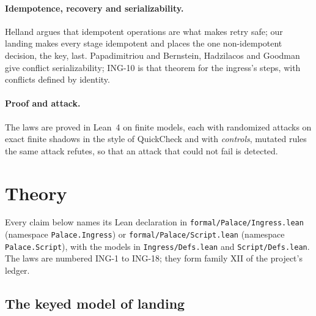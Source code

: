 \documentclass[11pt]{article}
\theoremstyle{plain}
\theoremstyle{definition}
\theoremstyle{remark}
\newcommand{\lean}[1]{\texttt{#1}}
\newcommand{\ing}[1]{ING-#1}
\begin{document}
\paragraph{Idempotence, recovery and serializability.}
Helland \citep{helland2012} argues that idempotent operations are what makes retry safe;
our landing makes every stage idempotent and places the one non-idempotent decision, the key,
last. Papadimitriou \citep{papadimitriou1979} and Bernstein, Hadzilacos and Goodman
\citep{bernstein1987} give conflict serializability; \ing{10} is that theorem for the ingress's
steps, with conflicts defined by identity.

\paragraph{Proof and attack.}
The laws are proved in Lean~4 \citep{demoura2021} on finite models, each with randomized
attacks on exact finite shadows in the style of QuickCheck \citep{claessen2000} and with
\emph{controls}, mutated rules the same attack refutes, so that an attack that could not fail
is detected.

\section{Theory}

Every claim below names its Lean declaration in \lean{formal/Palace/Ingress.lean} (namespace
\lean{Palace.Ingress}) or \lean{formal/Palace/Script.lean} (namespace \lean{Palace.Script}), with
the models in \lean{Ingress/Defs.lean} and \lean{Script/Defs.lean}. The laws are numbered
\ing{1} to \ing{18}; they form family XII of the project's ledger.

\subsection{The keyed model of landing}
\end{document}
